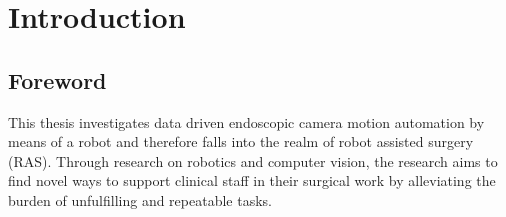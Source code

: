 \chapter[Introduction]{Introduction}
\label{chap:introduction}
\minitoc
\section{Foreword}
\label{in:sec:foreword}
This thesis investigates data driven endoscopic camera motion automation by means of a robot and therefore falls into the realm of robot assisted surgery (RAS). Through research on robotics and computer vision, the research aims to find novel ways to support clinical staff in their surgical work by alleviating the burden of unfulfilling and repeatable tasks.


